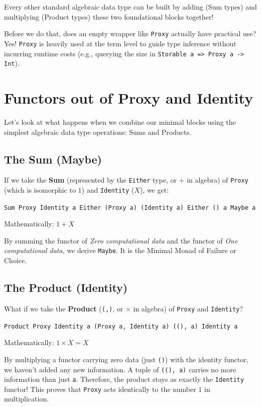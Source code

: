 \documentclass[12pt,a4paper]{article}
\begin{document}
Every other standard algebraic data type can be built by adding (Sum types) and multiplying (Product types) these two foundational blocks together!

Before we do that, does an empty wrapper like \texttt{Proxy} actually have practical use? Yes! \texttt{Proxy} is heavily used at the term level to guide type inference without incurring runtime costs (e.g., querying the size in \texttt{Storable a => Proxy a -> Int}).

\section{Functors out of Proxy and Identity}

Let's look at what happens when we combine our minimal blocks using the simplest algebraic data type operations: Sums and Products.

\subsection{The Sum (Maybe)}

If we take the \textbf{Sum} (represented by the \texttt{Either} type, or $+$ in algebra) of \texttt{Proxy} (which is isomorphic to $1$) and \texttt{Identity} ($X$), we get:

\texttt{Sum Proxy Identity a \cong Either (Proxy a) (Identity a) \cong Either () a \cong Maybe a}

Mathematically: $1 + X$

By summing the functor of \textit{Zero computational data} and the functor of \textit{One computational data}, we derive \texttt{Maybe}. It is the Minimal Monad of Failure or Choice.

\subsection{The Product (Identity)}

What if we take the \textbf{Product} (\texttt{(,)}, or $\times$ in algebra) of \texttt{Proxy} and \texttt{Identity}?

\texttt{Product Proxy Identity a \cong (Proxy a, Identity a) \cong ((), a) \cong Identity a}

Mathematically: $1 \times X = X$

By multiplying a functor carrying zero data (just \texttt{()}) with the identity functor, we haven't added any new information. A tuple of \texttt{((), a)} carries no more information than just \texttt{a}. Therefore, the product stays as exactly the \texttt{Identity} functor! This proves that \texttt{Proxy} acts identically to the number $1$ in multiplication.
\end{document}
